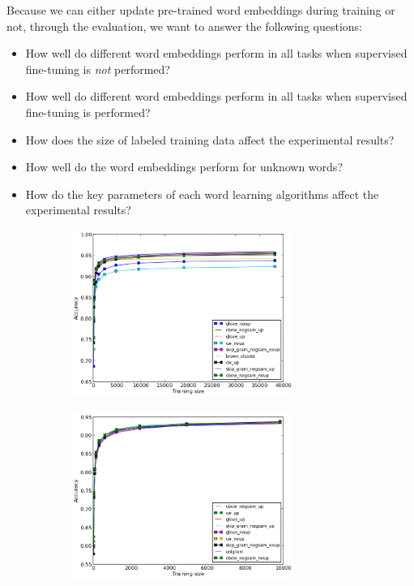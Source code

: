 \documentclass[11pt]{article}
\begin{document}
Because we can either update pre-trained word embeddings during training or not, through the evaluation, we want to answer the following questions:
\begin{itemize}
\item How well do different word embeddings perform in all tasks when supervised fine-tuning is \textit{not} performed?
\item How well do different word embeddings perform in all tasks when supervised fine-tuning is performed?
\item How does the size of labeled training data affect the experimental results?
\item How well do the word embeddings perform for unknown words? 
\item How do the key parameters of each word learning algorithms affect the experimental results?
\end{itemize}

\begin{figure}
\caption{Best results for each method for POS-Tagging and Chunking}
\centering
\begin{subfigure}{.5\textwidth}
	\centering
    \includegraphics[width=0.8\textwidth]{plots/bestPOS.png}    	
	\label{fig:bestpos}
\end{subfigure}%
\begin{subfigure}{.5\textwidth}
	\centering
    \includegraphics[width=0.8\textwidth]{plots/bestChunking.png}
	\label{fig:bestchunking}
\end{subfigure}
\end{figure}
\end{document}
